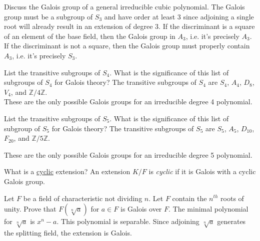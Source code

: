 \documentclass[avery5371,grid]{flashcards}
\newcommand{\Z}{\mathbb{Z}}
\begin{document}
\begin{flashcard}[Fields]{Discuss the Galois group of a general irreducible cubic polynomial.}
 The Galois group must be a subgroup of $S_3$ and have order at least 3 since adjoining a single root will already result in an extension of degree 3. If the discriminant is a square of an element of the base field, then the Galois group in $A_3$, i.e. it's precisely $A_3$. If the discriminant is not a square, then the Galois group must properly contain $A_3$, i.e. it's precisely $S_3$.
\end{flashcard}

\begin{flashcard}[Fields]{List the transitive subgroups of $S_4$. What is the significance of this list of subgroups of $S_4$ for Galois theory?}
 The transitive subgroups of $S_4$ are $S_4$, $A_4$, $D_8$, $V_4$, and $\Z/4\Z$.\\
 
 These are the only possible Galois groups for an irreducible degree 4 polynomial.
\end{flashcard}

\begin{flashcard}[Fields]{List the transitive subgroups of $S_5$. What is the significance of this list of subgroup of $S_5$ for Galois theory?}
 The transitive subgroups of $S_5$ are $S_5$, $A_5$, $D_{10}$, $F_{20}$, and $\Z/5\Z.$
 
 These are the only possible Galois groups for an irreducible degree 5 polynomial.
\end{flashcard}

\begin{flashcard}[Fields]{What is a \underline{cyclic} extension?}
 An extension $K/F$ is \emph{cyclic} if it is Galois with a cyclic Galois group.
\end{flashcard}

\begin{flashcard}[Fields]{Let $F$ be a field of characteristic not dividing $n$. Let $F$ contain the $n^{th}$ roots of unity. Prove that $F(\sqrt[n]{a})$ for $a \in F$ is Galois over $F$.}
 The minimal polynomial for $\sqrt[n]{a}$ is $x^n - a$. This polynomial is separable. Since adjoining $\sqrt[n]{a}$ generates the splitting field, the extension is Galois.
\end{flashcard}
\end{document}

